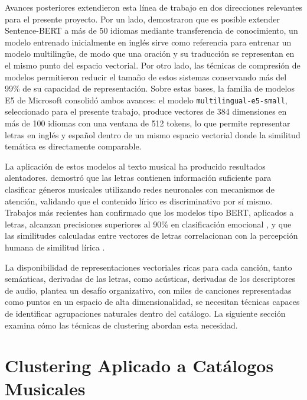Avances posteriores extendieron esta línea de trabajo en dos direcciones relevantes para el presente proyecto. Por un lado, \textcite{reimers_2020_multilingual} demostraron que es posible extender Sentence-BERT a más de 50 idiomas mediante transferencia de conocimiento, un modelo entrenado inicialmente en inglés sirve como referencia para entrenar un modelo multilingüe, de modo que una oración y su traducción se representan en el mismo punto del espacio vectorial. Por otro lado, las técnicas de compresión de modelos \parencite{wang_2020_minilm} permitieron reducir el tamaño de estos sistemas conservando más del 99\% de su capacidad de representación. Sobre estas bases, la familia de modelos E5 de Microsoft consolidó ambos avances: el modelo \texttt{multilingual-e5-small}, seleccionado para el presente trabajo, produce vectores de 384 dimensiones en más de 100 idiomas con una ventana de 512 tokens, lo que permite representar letras en inglés y español dentro de un mismo espacio vectorial donde la similitud temática es directamente comparable.

La aplicación de estos modelos al texto musical ha producido resultados alentadores. \textcite{tsaptsinos_2017_lyricals} demostró que las letras contienen información suficiente para clasificar géneros musicales utilizando redes neuronales con mecanismos de atención, validando que el contenido lírico es discriminativo por sí mismo. Trabajos más recientes han confirmado que los modelos tipo BERT, aplicados a letras, alcanzan precisiones superiores al 90\% en clasificación emocional \parencite{parada_cabaleiro_2022_lybert}, y que las similitudes calculadas entre vectores de letras correlacionan con la percepción humana de similitud lírica \parencite{akama_2024_lyric_similarity}.

La disponibilidad de representaciones vectoriales ricas para cada canción, tanto semánticas, derivadas de las letras, como acústicas, derivadas de los descriptores de audio, plantea un desafío organizativo, con miles de canciones representadas como puntos en un espacio de alta dimensionalidad, se necesitan técnicas capaces de identificar agrupaciones naturales dentro del catálogo. La siguiente sección examina cómo las técnicas de clustering abordan esta necesidad.

\section{Clustering Aplicado a Catálogos Musicales}
\label{sec:clustering-catalogos}

